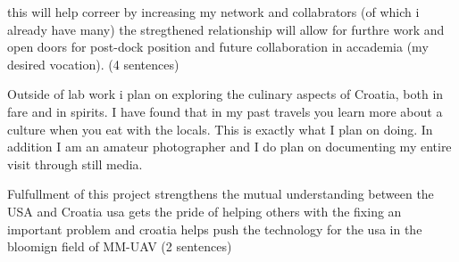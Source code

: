 \documentclass[12pt]{article}
\begin{document}
this will help correer by increasing my network and collabrators (of which i already have many)  the 
stregthened relationship will allow for furthre work and open doors for post-dock position and future 
collaboration in accademia (my desired vocation).  (4 sentences)

Outside of lab work i plan on exploring the culinary aspects of Croatia, both in fare and in spirits.  I have found that in my past travels you learn more about a culture when you eat with the locals.  This is exactly what I plan on doing.  In addition I am an amateur photographer and I do plan on documenting my entire visit through still media.

Fulfullment of this project strengthens the mutual understanding between the USA and Croatia 
usa gets the pride of helping others with the fixing an important problem and croatia helps push the 
technology for the usa in the bloomign field of MM-UAV (2 sentences)
\end{document}
